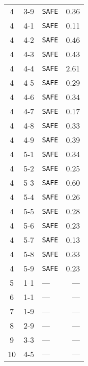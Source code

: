 \documentclass{article}%
\begin{document}
\begin{longtable}{@{}cll|r@{}}
4&3{-}9&\verb|SAFE|&0.36\\%
4&4{-}1&\verb|SAFE|&0.11\\%
4&4{-}2&\verb|SAFE|&0.46\\%
4&4{-}3&\verb|SAFE|&0.43\\%
4&4{-}4&\verb|SAFE|&2.61\\%
4&4{-}5&\verb|SAFE|&0.29\\%
4&4{-}6&\verb|SAFE|&0.34\\%
4&4{-}7&\verb|SAFE|&0.17\\%
4&4{-}8&\verb|SAFE|&0.33\\%
4&4{-}9&\verb|SAFE|&0.39\\%
4&5{-}1&\verb|SAFE|&0.34\\%
4&5{-}2&\verb|SAFE|&0.25\\%
4&5{-}3&\verb|SAFE|&0.60\\%
4&5{-}4&\verb|SAFE|&0.26\\%
4&5{-}5&\verb|SAFE|&0.28\\%
4&5{-}6&\verb|SAFE|&0.23\\%
4&5{-}7&\verb|SAFE|&0.13\\%
4&5{-}8&\verb|SAFE|&0.33\\%
4&5{-}9&\verb|SAFE|&0.23\\%
5&1{-}1&—&—\\%
6&1{-}1&—&—\\%
7&1{-}9&—&—\\%
8&2{-}9&—&—\\%
9&3{-}3&—&—\\%
10&4{-}5&—&—\\\bottomrule%
%
\end{longtable}

%
\end{document}
